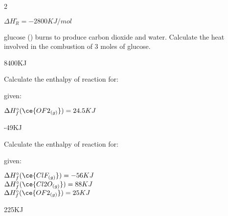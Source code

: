 \documentclass[main.tex]{subfiles}
\begin{document}
\begin{multicols*}{2}
\begin{question}[ID=\the\value{numA}]
 \begin{center} \hspace*{0pt}\hfill $\Delta H^{\circ}_R=	   -2800KJ/mol$\end{center}
glucose () burns to produce carbon dioxide and water. Calculate the heat involved in the combustion of 3 moles of glucose.\end{question}
\begin{solution}
8400KJ
 \hspace{0.1cm}\end{solution}
\begin{question}[ID=\the\value{numA}]
Calculate the enthalpy of reaction for:
\begin{center}\end{center}
given:
\begin{center}
$\Delta H^{\circ}_f(\ce{OF2_{(g)}})=24.5KJ$
\end{center}
\end{question}
\begin{solution}
-49KJ
 \hspace{0.1cm}\end{solution}
\begin{question}[ID=\the\value{numA}]
Calculate the enthalpy of reaction for:
\begin{center}\end{center}
given:
\begin{center}
$\Delta H^{\circ}_f(\ce{ClF_{(g)}})=-56KJ$\\
$\Delta H^{\circ}_f(\ce{Cl2O_{(g)}})=88KJ$\\
$\Delta H^{\circ}_f(\ce{OF2_{(g)}})=25KJ$
\end{center}
\end{question}
\begin{solution}
225KJ
 \hspace{0.1cm}\end{solution}


\end{multicols*}
\end{document}
